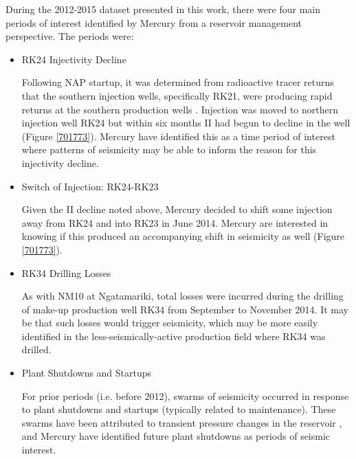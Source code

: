During the 2012-2015 dataset presented in this work, there were four main periods of interest identified by Mercury from a reservoir management perspective. The periods were:
\begin{itemize}
  \item{RK24 Injectivity Decline}
  
  Following NAP startup, it was determined from radioactive tracer returns that the southern injection wells, specifically RK21, were producing rapid returns at the southern production wells \citep{addison2015rotokawa}. Injection was moved to northern injection well RK24 but within six months II had begun to decline in the well (Figure \ref{701773}). Mercury have identified this as a time period of interest where patterns of seismicity may be able to inform the reason for this injectivity decline.
  \item{Switch of Injection: RK24-RK23}
  
  Given the II decline noted above, Mercury decided to shift some injection away from RK24 and into RK23 in June 2014. Mercury are interested in knowing if this produced an accompanying shift in seismicity as well (Figure \ref{701773}).
  \item{RK34 Drilling Losses}
  
  As with NM10 at Ngatamariki, total losses were incurred during the drilling of make-up production well RK34 from September to November 2014. It may be that such losses would trigger seismicity, which may be more easily identified in the less-seismically-active production field where RK34 was drilled.
  \item{Plant Shutdowns and Startups}
  
  For prior periods (i.e. before 2012), swarms of seismicity occurred in response to plant shutdowns and startups (typically related to maintenance). These swarms have been attributed to transient pressure changes in the reservoir \citep{Sherburn_2015}, and Mercury have identified future plant shutdowns as periods of seismic interest.
\end{itemize}


